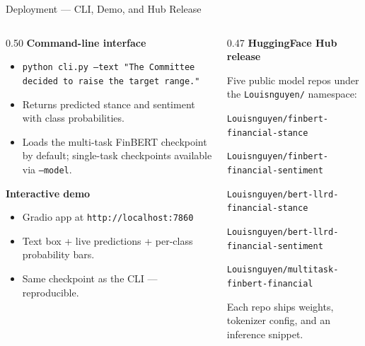 \documentclass[10pt, aspectratio=169]{beamer}
\begin{document}
\begin{frame}{Deployment --- CLI, Demo, and Hub Release}
    \begin{columns}[T]
        \begin{column}{0.50\textwidth}
            \textbf{Command-line interface}
            \begin{itemize}\setlength{\itemsep}{1pt}
                \item \texttt{python cli.py --text "The Committee decided to raise the target range."}
                \item Returns predicted stance and sentiment with class probabilities.
                \item Loads the multi-task FinBERT checkpoint by default; single-task checkpoints available via \texttt{--model}.
            \end{itemize}

            \vspace{0.3em}
            \textbf{Interactive demo}
            \begin{itemize}\setlength{\itemsep}{1pt}
                \item Gradio app at \texttt{http://localhost:7860}
                \item Text box + live predictions + per-class probability bars.
                \item Same checkpoint as the CLI --- reproducible.
            \end{itemize}
        \end{column}
        \begin{column}{0.47\textwidth}
            \textbf{HuggingFace Hub release}

            Five public model repos under the \texttt{Louisnguyen/} namespace:
            \begin{itemize}\setlength{\itemsep}{1pt}
                {\scriptsize
                \item \texttt{Louisnguyen/finbert-financial-stance}
                \item \texttt{Louisnguyen/finbert-financial-sentiment}
                \item \texttt{Louisnguyen/bert-llrd-financial-stance}
                \item \texttt{Louisnguyen/bert-llrd-financial-sentiment}
                \item \texttt{Louisnguyen/multitask-finbert-financial}
                }
            \end{itemize}

            \vspace{0.3em}
            {\small Each repo ships weights, tokenizer config, and an inference snippet.}
        \end{column}
    \end{columns}
\end{frame}
\end{document}
